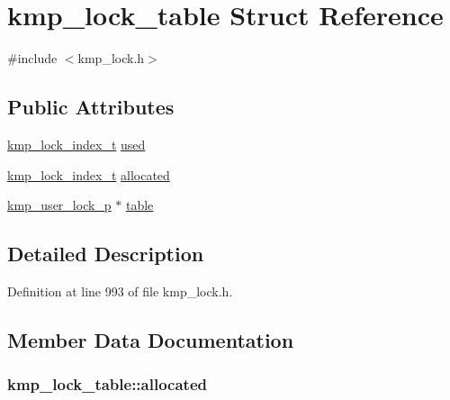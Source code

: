 \hypertarget{structkmp__lock__table}{\section{kmp\-\_\-lock\-\_\-table Struct Reference}
\label{structkmp__lock__table}
}


{\ttfamily \#include $<$kmp\-\_\-lock.\-h$>$}

\subsection*{Public Attributes}
\begin{DoxyCompactItemize}
\item 
\hyperlink{kmp__lock_8h_ab39663a4351cc2f0ef04180107a5db84}{kmp\-\_\-lock\-\_\-index\-\_\-t} \hyperlink{structkmp__lock__table_a92f49bd4acf0bbe4548629b8010bcc3b}{used}
\item 
\hyperlink{kmp__lock_8h_ab39663a4351cc2f0ef04180107a5db84}{kmp\-\_\-lock\-\_\-index\-\_\-t} \hyperlink{structkmp__lock__table_a39d3ce64fcbf71b41c2b3ac1dccbb05a}{allocated}
\item 
\hyperlink{kmp__lock_8h_a35c88b3ea74b2a8d633ec8156c1c4670}{kmp\-\_\-user\-\_\-lock\-\_\-p} $\ast$ \hyperlink{structkmp__lock__table_a89b0c01b5aebf4417258655f6d55ff16}{table}
\end{DoxyCompactItemize}


\subsection{Detailed Description}


Definition at line 993 of file kmp\-\_\-lock.\-h.



\subsection{Member Data Documentation}
\hypertarget{structkmp__lock__table_a39d3ce64fcbf71b41c2b3ac1dccbb05a}{
\subsubsection[{allocated}]{ kmp\-\_\-lock\-\_\-table\-::allocated}}\label{structkmp__lock__table_a39d3ce64fcbf71b41c2b3ac1dccbb05a}


